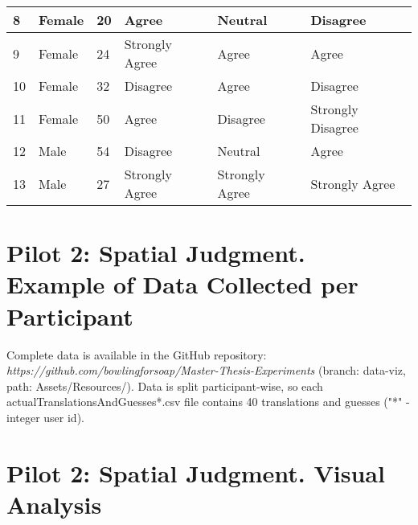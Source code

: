 \begin{appendices}
\begin{table}[]
\begin{tabular}{|l|l|l|l|l|l|}
		8                       & Female          & 20           & Agree                                                             & Neutral                           & Disagree                                  \\ \hline
		9                       & Female          & 24           & Strongly Agree                                                    & Agree                             & Agree                                     \\ \hline
		10                      & Female          & 32           & Disagree                                                          & Agree                             & Disagree                                  \\ \hline
		11                      & Female          & 50           & Agree                                                             & Disagree                          & Strongly Disagree                         \\ \hline
		12                      & Male            & 54           & Disagree                                                          & Neutral                           & Agree                                     \\ \hline
		13                      & Male            & 27           & Strongly Agree                                                    & Strongly Agree                    & Strongly Agree                            \\ \hline
	\end{tabular}
\end{table}	


\chapter{Pilot 2: Spatial Judgment. Example of Data Collected per Participant}
\label{app:pilot2data_collected}
Complete data is available in the GitHub repository: \textit{https://github.com/bowlingforsoap/Master-Thesis-Experiments} (branch: data-viz, path: Assets/Resources/). Data is split participant-wise, so each actualTranslationsAndGuesses*.csv file contains 40 translations and guesses ("*" - integer user id).

\chapter{Pilot 2: Spatial Judgment. Visual Analysis}
\label{app:pilot2visual_analysis}


\end{appendices}
